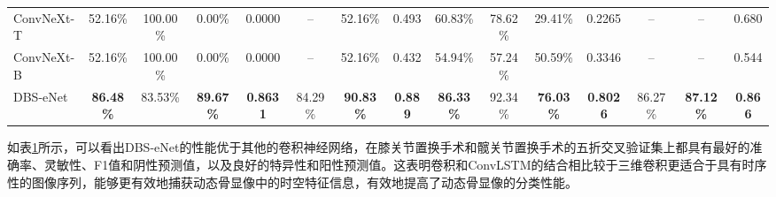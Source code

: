 \begin{table}[htbp]
{\begin{tabular}{lcccccccccccccc}
      ConvNeXt-T  & 52.16\%                            & 100.00\%                           & 0.00\%           & 0.0000          & –                & 52.16\%          & 0.493          & 60.83\%          & 78.62\%          & 29.41\%          & 0.2265          & –                & –                & 0.680          \\
      ConvNeXt-B  & 52.16\%                            & 100.00\%                           & 0.00\%           & 0.0000          & –                & 52.16\%          & 0.432          & 54.94\%          & 57.24\%          & 50.59\%          & 0.3346          & –                & –                & 0.544          \\
      DBS-eNet    & \textbf{86.48\%}                   & 83.53\%                            & \textbf{89.67\%} & \textbf{0.8631} & 84.29\%          & \textbf{90.83\%} & \textbf{0.889} & \textbf{86.33\%} & 92.34\%          & \textbf{76.03\%} & \textbf{0.8026} & 86.27\%          & \textbf{87.12\%} & \textbf{0.866} \\
      \bottomrule
    \end{tabular}
  }
  \label{tab:chap03_DBS-eNet_vs_CNN}
\end{table}

如表\ref{tab:chap03_DBS-eNet_vs_CNN}所示，可以看出DBS-eNet的性能优于其他的卷积神经网络，在膝关节置换手术和髋关节置换手术的五折交叉验证集上都具有最好的准确率、灵敏性、F1值和阴性预测值，以及良好的特异性和阳性预测值。这表明卷积和ConvLSTM的结合相比较于三维卷积更适合于具有时序性的图像序列，能够更有效地捕获动态骨显像中的时空特征信息，有效地提高了动态骨显像的分类性能。

